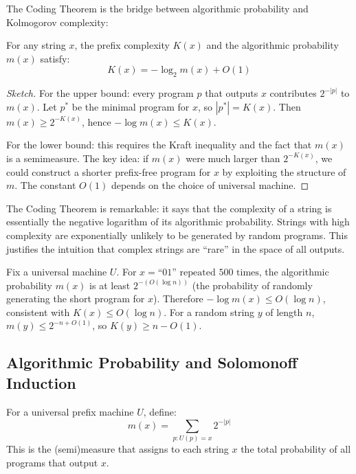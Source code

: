 The Coding Theorem is the bridge between algorithmic probability and Kolmogorov complexity:

\begin{theorem}
For any string $x$, the prefix complexity $K(x)$ and the algorithmic probability $m(x)$ satisfy:
\[
K(x) = -\log_2 m(x) + O(1)
\]
\end{theorem}

\begin{proof}[Sketch]
For the upper bound: every program $p$ that outputs $x$ contributes $2^{-|p|}$ to $m(x)$. Let $p^*$ be the minimal program for $x$, so $|p^*| = K(x)$. Then $m(x) \ge 2^{-K(x)}$, hence $-\log m(x) \le K(x)$. 

For the lower bound: this requires the Kraft inequality and the fact that $m(x)$ is a semimeasure. The key idea: if $m(x)$ were much larger than $2^{-K(x)}$, we could construct a shorter prefix-free program for $x$ by exploiting the structure of $m$. The constant $O(1)$ depends on the choice of universal machine.
\end{proof}

The Coding Theorem is remarkable: it says that the complexity of a string is essentially the negative logarithm of its algorithmic probability. Strings with high complexity are exponentially unlikely to be generated by random programs. This justifies the intuition that complex strings are ``rare'' in the space of all outputs.

\begin{example}
Fix a universal machine $U$. For $x = \text{``01'' repeated 500 times}$, the algorithmic probability $m(x)$ is at least $2^{-(O(\log n))}$ (the probability of randomly generating the short program for $x$). Therefore $-\log m(x) \le O(\log n)$, consistent with $K(x) \le O(\log n)$. For a random string $y$ of length $n$, $m(y) \le 2^{-n + O(1)}$, so $K(y) \ge n - O(1)$.
\end{example}

\subsection{Algorithmic Probability and Solomonoff Induction}
\label{sec:kolmogorov:prob}

\begin{definition}
For a universal prefix machine $U$, define:
\[
m(x) = \sum_{p: U(p) = x} 2^{-|p|}
\]
This is the (semi)measure that assigns to each string $x$ the total probability of all programs that output $x$.
\end{definition}

